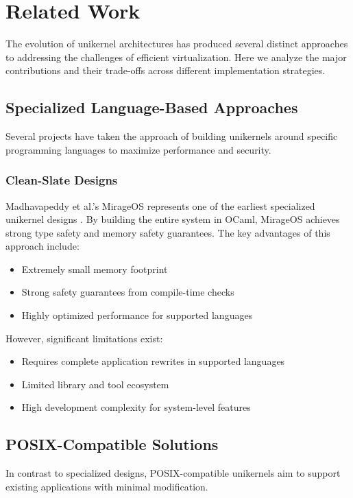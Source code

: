 \documentclass[conference]{IEEEtran}
\begin{document}
\section{Related Work}
The evolution of unikernel architectures has produced several distinct approaches to addressing the challenges of efficient virtualization. Here we analyze the major contributions and their trade-offs across different implementation strategies.

\subsection{Specialized Language-Based Approaches}
Several projects have taken the approach of building unikernels around specific programming languages to maximize performance and security.

\subsubsection{Clean-Slate Designs}
Madhavapeddy et al.'s MirageOS represents one of the earliest specialized unikernel designs \cite{linux_kernel_clothing}. By building the entire system in OCaml, MirageOS achieves strong type safety and memory safety guarantees. The key advantages of this approach include:
\begin{itemize}
	\item Extremely small memory footprint
	\item Strong safety guarantees from compile-time checks
	\item Highly optimized performance for supported languages
\end{itemize}

However, significant limitations exist:
\begin{itemize}
	\item Requires complete application rewrites in supported languages
	\item Limited library and tool ecosystem
	\item High development complexity for system-level features
\end{itemize}

\subsection{POSIX-Compatible Solutions}
In contrast to specialized designs, POSIX-compatible unikernels aim to support existing applications with minimal modification.
\end{document}
